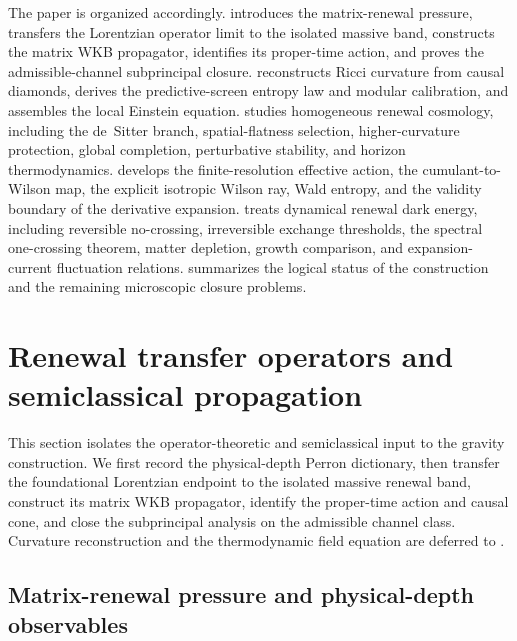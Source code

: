 \documentclass[11pt]{article}
\theoremstyle{definition}
\theoremstyle{remark}
\begin{document}
The paper is organized accordingly.   introduces the matrix-renewal pressure, transfers the Lorentzian operator limit to the isolated massive band, constructs the matrix WKB propagator, identifies its proper-time action, and proves the admissible-channel subprincipal closure.   reconstructs Ricci curvature from causal diamonds, derives the predictive-screen entropy law and modular calibration, and assembles the local Einstein equation.   studies homogeneous renewal cosmology, including the de~Sitter branch, spatial-flatness selection, higher-curvature protection, global completion, perturbative stability, and horizon thermodynamics.   develops the finite-resolution effective action, the cumulant-to-Wilson map, the explicit isotropic Wilson ray, Wald entropy, and the validity boundary of the derivative expansion.   treats dynamical renewal dark energy, including reversible no-crossing, irreversible exchange thresholds, the spectral one-crossing theorem, matter depletion, growth comparison, and expansion-current fluctuation relations.   summarizes the logical status of the construction and the remaining microscopic closure problems.


\section{Renewal transfer operators and semiclassical propagation}
\label{sec:kinematics}

This section isolates the operator-theoretic and semiclassical input to the
gravity construction.  We first record the physical-depth Perron dictionary,
then transfer the foundational Lorentzian endpoint to the isolated massive
renewal band, construct its matrix WKB propagator, identify the proper-time
action and causal cone, and close the subprincipal analysis on the admissible
channel class.  Curvature reconstruction and the thermodynamic field equation
are deferred to .

\subsection{Matrix-renewal pressure and physical-depth observables}
\label{subsec:matrix-renewal-dictionary}
\end{document}
